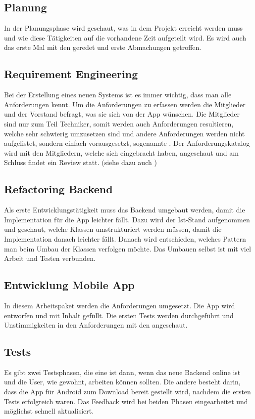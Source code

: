 \subsection{Planung}\label{planung}
In der Planungsphase wird geschaut, was in dem Projekt erreicht werden muss und wie diese Tätigkeiten auf die vorhandene Zeit aufgeteilt wird. Es wird auch das erste Mal mit den  geredet und erste Abmachungen getroffen.

\subsection{Requirement Engineering}\label{rqe}
Bei der Erstellung eines neuen Systems ist es immer wichtig, dass man alle Anforderungen kennt. Um die Anforderungen zu erfassen werden die Mitglieder und der Vorstand befragt, was sie sich von der App wünschen. Die Mitglieder sind nur zum Teil Techniker, somit werden auch Anforderungen resultieren, welche sehr schwierig umzusetzen sind und andere Anforderungen werden nicht aufgelistet, sondern einfach vorausgesetzt, sogenannte . Der Anforderungskatalog wird mit den Mitgliedern, welche sich eingebracht haben, angeschaut und am Schluss findet ein Review statt. (siehe dazu auch \cite{req_eng_book})

\subsection{Refactoring Backend}\label{ref_backend}
Als erste Entwicklungstätigkeit muss das Backend umgebaut werden, damit die Implementation für die App leichter fällt. Dazu wird der Ist-Stand aufgenommen und geschaut, welche Klassen umstrukturiert werden müssen, damit die Implementation danach leichter fällt. Danach wird entschieden, welches Pattern man beim Umbau der Klassen verfolgen möchte. Das Umbauen selbst ist mit viel Arbeit und Testen verbunden.

\subsection{Entwicklung Mobile App}\label{eng_app}
In diesem Arbeitspaket werden die Anforderungen umgesetzt. Die App wird entworfen und mit Inhalt gefüllt. Die ersten Tests werden durchgeführt und Unstimmigkeiten in den Anforderungen mit den  angeschaut.

\subsection{Tests}\label{tests}
Es gibt zwei Testsphasen, die eine ist dann, wenn das neue Backend online ist und die User, wie gewohnt, arbeiten können sollten. Die andere besteht darin, dass die App für Android zum Download bereit gestellt wird, nachdem die ersten Tests erfolgreich waren.  Das Feedback wird bei beiden Phasen eingearbeitet und möglichst schnell aktualisiert.

